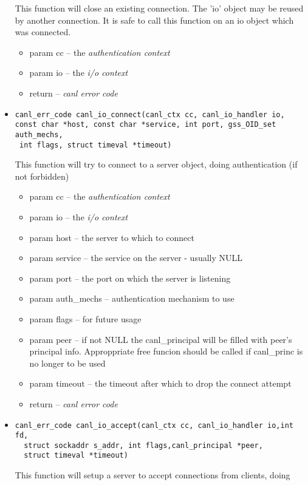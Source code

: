 \begin{itemize}
  This function will close an existing connection.  The 'io' object may 
  be reused by another connection. It is safe to call this 
  function on an io object which was connected.
  \begin{itemize}
    \item param cc -- the \textit{authentication context}
    \item param io -- the \textit{i/o context}
    \item return -- \textit{canl error code}
  \end{itemize}
  \item \begin{verbatim}canl_err_code canl_io_connect(canl_ctx cc, canl_io_handler io, 
const char *host, const char *service, int port, gss_OID_set auth_mechs,
 int flags, struct timeval *timeout)\end{verbatim}
  This function will try to connect to a server object, 
  doing authentication (if not forbidden)
  \begin{itemize}
    \item param cc -- the \textit{authentication context}
    \item param io -- the \textit{i/o context}
    \item param host -- the server to which to connect
    \item param service -- the service on the server - usually NULL
    \item param port -- the port on which the server is listening
    \item param auth\_mechs -- authentication mechanism to use
    \item param flags -- for future usage
    \item param peer -- if not NULL the canl\_principal will be filled with peer's principal info. Approppriate free funcion should be called if canl\_princ is no longer to be used
    \item param timeout -- the timeout after which to drop the connect attempt
    \item return -- \textit{canl error code}
  \end{itemize}
  \item \begin{verbatim}canl_err_code canl_io_accept(canl_ctx cc, canl_io_handler io,int fd,
  struct sockaddr s_addr, int flags,canl_principal *peer,
  struct timeval *timeout)\end{verbatim}
  This function will 
  setup a server to accept connections from clients, doing 

\end{itemize}
